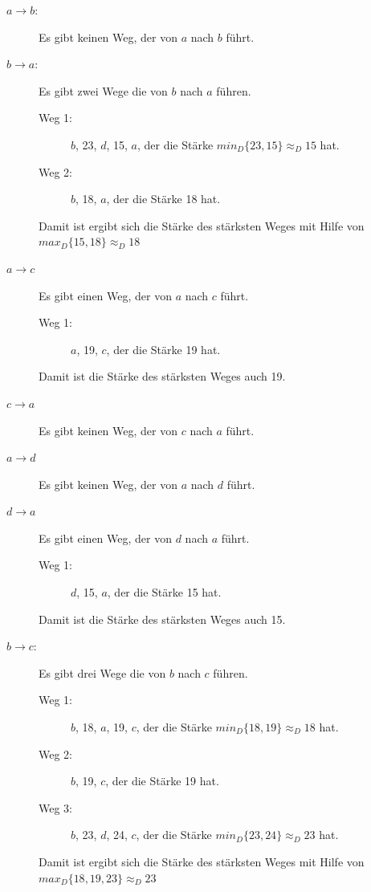 \begin{description}
\item[$a \to b$:] Es gibt keinen Weg, der von $a$ nach $b$ führt.

\item[$b \to a$:] Es gibt zwei Wege die von $b$ nach $a$ führen.
	\begin{description}
	\item[Weg 1:] $b$, 23, $d$, 15, $a$, der die Stärke $min_{D}\{23, 15 \}\approx_{D}15$ hat.
	\item[Weg 2:] $b$, 18, $a$, der die Stärke 18 hat.
	\end{description}
	Damit ist ergibt sich die Stärke des stärksten Weges mit Hilfe von $max_{D}\{15, 18\}\approx_{D}18$
	
\item[$a \to c$] Es gibt einen Weg, der von $a$ nach $c$ führt.
	\begin{description}
	\item[Weg 1:] $a$, 19, $c$, der die Stärke 19 hat.
	\end{description}
	Damit ist die Stärke des stärksten Weges auch 19.
	
\item[$c \to a$] Es gibt keinen Weg, der von $c$ nach $a$ führt.

\item[$a \to d$] Es gibt keinen Weg, der von $a$ nach $d$ führt.

\item[$d \to a$] Es gibt einen Weg, der von $d$ nach $a$ führt.
	\begin{description}
	\item[Weg 1:] $d$, 15, $a$, der die Stärke 15 hat.
	\end{description}
	Damit ist die Stärke des stärksten Weges auch 15.
	
\item[$b \to c$:] Es gibt drei Wege die von $b$ nach $c$ führen.
	\begin{description}
	\item[Weg 1:] $b$, 18, $a$, 19, $c$, der die Stärke $min_{D}\{18, 19 \}\approx_{D}18$ hat.
	\item[Weg 2:] $b$, 19, $c$, der die Stärke 19 hat.
	\item[Weg 3:] $b$, 23, $d$, 24, $c$, der die Stärke $min_{D}\{23, 24 \}\approx_{D}23$ hat.
	\end{description}
	Damit ist ergibt sich die Stärke des stärksten Weges mit Hilfe von $max_{D}\{18, 19, 23 \}\approx_{D}23$
	

\end{description}
